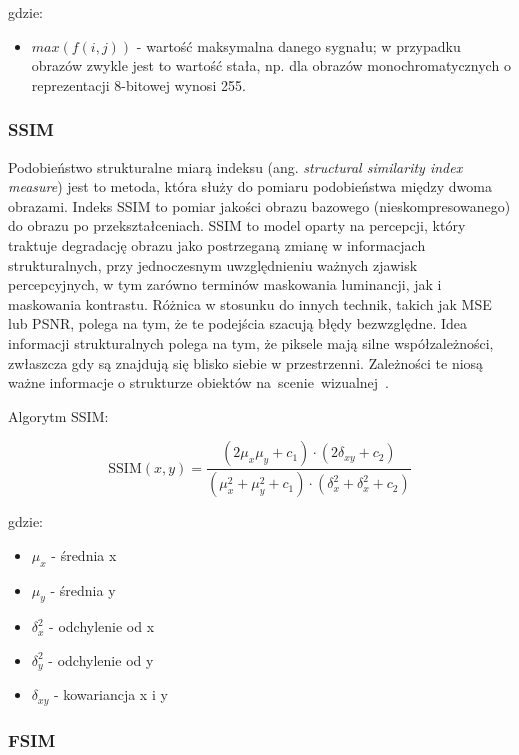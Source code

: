 \documentclass{article}
\begin{document}
gdzie:
\begin{itemize}[label=]
  \item $max(f(i,j))$ - wartość maksymalna danego sygnału; w przypadku obrazów zwykle jest to wartość stała,
        np. dla obrazów monochromatycznych o reprezentacji 8-bitowej wynosi 255.
\end{itemize}

\subsubsection{SSIM}

Podobieństwo strukturalne miarą indeksu (ang. \emph{structural similarity index measure}) jest to metoda, która służy 
do pomiaru podobieństwa między dwoma obrazami. Indeks SSIM to pomiar jakości obrazu bazowego (nieskompresowanego) 
do obrazu po przekształceniach. SSIM to model oparty na percepcji, który traktuje degradację obrazu jako postrzeganą zmianę
w informacjach strukturalnych, przy jednoczesnym uwzględnieniu ważnych zjawisk percepcyjnych, w tym zarówno terminów maskowania 
luminancji, jak i maskowania kontrastu. Różnica w stosunku do innych technik, takich jak MSE lub PSNR,
polega na tym, że te podejścia szacują błędy bezwzględne. Idea informacji strukturalnych polega na tym, że piksele mają silne współzależności,
zwłaszcza gdy są znajdują się blisko siebie w przestrzenni. Zależności te niosą ważne informacje o strukturze obiektów \mbox{na scenie wizualnej \cite{channappayya2008rate}.}

Algorytm SSIM:

\begin{equation}
    \mathrm{SSIM}(x, y) = \frac{(2\mu_{x}\mu_{y} + c_{1}) \cdot (2\delta_{xy} + c_2)}{(\mu_{x}^2 + \mu_{y}^2 + c_{1}) \cdot (\delta_{x}^2 + \delta_{x}^2 + c_2)}
\end{equation}

gdzie:
\begin{itemize}[label=]
  \item $\mu_{x}$ - średnia x
  \item $\mu_{y}$ - średnia y
  \item $\delta_{x}^2$ - odchylenie od x
  \item $\delta_{y}^2$ - odchylenie od y
  \item $\delta_{xy}$ - kowariancja x i y
\end{itemize}

\subsubsection{FSIM}
\end{document}
